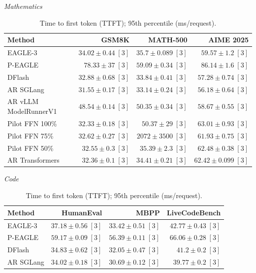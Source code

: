 \documentclass[conference,onecolumn]{IEEEtran}
\begin{document}
\begin{table}[!htp]
\centering\small
\setlength{\tabcolsep}{3pt}
\caption{Time to first token (TTFT); 95th percentile (ms/request).}
\label{tab:appendix-metric-ttft-95th-percentile-none}
\textit{Mathematics}\par\smallskip
\begin{tabular}{@{}>{\raggedright\arraybackslash}p{3.7cm}rrr@{}}
\toprule
Method & GSM8K & MATH-500 & AIME 2025 \\
\midrule
EAGLE-3 & \(34.02 \pm 0.44\;[3]\) & \(35.7 \pm 0.089\;[3]\) & \(59.57 \pm 1.2\;[3]\) \\
P-EAGLE & \(78.33 \pm 37\;[3]\) & \(59.09 \pm 0.34\;[3]\) & \(86.14 \pm 1.6\;[3]\) \\
DFlash & \(32.88 \pm 0.68\;[3]\) & \(33.84 \pm 0.41\;[3]\) & \(57.28 \pm 0.74\;[3]\) \\
AR \textperiodcentered{} SGLang & \(\mathbf{31.55} \pm 0.17\;[3]\) & \(\mathbf{33.14} \pm 0.24\;[3]\) & \(\mathbf{56.18} \pm 0.64\;[3]\) \\
AR \textperiodcentered{} vLLM ModelRunnerV1 & \(48.54 \pm 0.14\;[3]\) & \(50.35 \pm 0.34\;[3]\) & \(58.67 \pm 0.55\;[3]\) \\
Pilot FFN 100\% & \(32.33 \pm 0.18\;[3]\) & \(50.37 \pm 29\;[3]\) & \(63.01 \pm 0.93\;[3]\) \\
Pilot FFN 75\% & \(32.62 \pm 0.27\;[3]\) & \(2072 \pm 3500\;[3]\) & \(61.93 \pm 0.75\;[3]\) \\
Pilot FFN 50\% & \(32.55 \pm 0.3\;[3]\) & \(35.39 \pm 2.3\;[3]\) & \(62.48 \pm 0.38\;[3]\) \\
AR \textperiodcentered{} Transformers & \(32.36 \pm 0.1\;[3]\) & \(34.41 \pm 0.21\;[3]\) & \(62.42 \pm 0.099\;[3]\) \\
\bottomrule
\end{tabular}\par\medskip
\textit{Code}\par\smallskip
\begin{tabular}{@{}>{\raggedright\arraybackslash}p{3.7cm}rrr@{}}
\toprule
Method & HumanEval & MBPP & LiveCodeBench \\
\midrule
EAGLE-3 & \(37.18 \pm 0.56\;[3]\) & \(33.42 \pm 0.51\;[3]\) & \(42.77 \pm 0.43\;[3]\) \\
P-EAGLE & \(59.17 \pm 0.09\;[3]\) & \(56.39 \pm 0.11\;[3]\) & \(66.06 \pm 0.28\;[3]\) \\
DFlash & \(34.83 \pm 0.62\;[3]\) & \(32.05 \pm 0.47\;[3]\) & \(41.2 \pm 0.2\;[3]\) \\
AR \textperiodcentered{} SGLang & \(\mathbf{34.02} \pm 0.18\;[3]\) & \(\mathbf{30.69} \pm 0.12\;[3]\) & \(\mathbf{39.77} \pm 0.2\;[3]\) \\

\end{tabular}
\end{table}
\end{document}
